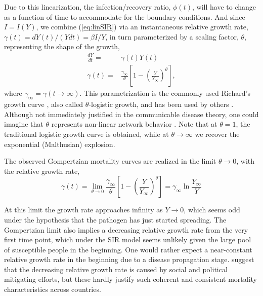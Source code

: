 \documentclass{article}
\begin{document}
 Due to this linearization, the infection/recovery ratio, $\phi(t)$, will have to change as a function of time to accommodate for the boundary conditions. And since $I=I(Y)$, we combine (\ref{eq:linSIR}) via an instantaneous relative growth rate, $\gamma(t) = dY(t) /(Ydt) = \beta I / Y$, in turn parameterized by a scaling factor, $\theta$, representing the shape of the growth,
\begin{subequations}
\label{eq:rypdal}
\begin{align}
\frac{dY}{dt} =& \gamma(t) Y(t) \label{eq:rypdalODE}\\
\gamma(t) =& \frac{\gamma_{\infty}}{\theta}\left[1 - \left(\frac{Y}{Y_{\infty}}\right)^{\theta} \right] \label{eq:rypdalGamma},
\end{align}
\end{subequations}
where $\gamma_{\infty} = \gamma(t\rightarrow \infty)$. This parametrization is the commonly used Richard's growth curve \citep{richards1959flexible}, also called $\theta$-logistic growth, and has been used by others \citep{wu2020generalized}. Although not immediately justified in the communicable disease theory, one could imagine that $\theta$ represents non-linear network behavior \citep{petroni2020logistic}. Note that at $\theta=1$, the traditional logistic growth curve is obtained, while at $\theta\rightarrow \infty$ we recover the exponential (Malthusian) explosion.

The observed Gompertzian mortality curves are realized in the limit $\theta \rightarrow 0$, with the relative growth rate, 
\begin{equation}
\label{eq:rypdalLimit}
\gamma(t) = \lim_{\theta \rightarrow 0}\frac{\gamma_{\infty}}{\theta}\left[1 - \left(\frac{Y}{Y_{\infty}}\right)^{\theta} \right]
= \gamma_{\infty}\ln{\frac{Y_{\infty}}{Y}}
\end{equation}

 At this limit the growth rate approaches infinity as $Y \rightarrow 0$, which seems odd under the hypothesis that the pathogen has just started spreading. 
 The Gompertzian limit also implies a decreasing relative growth rate from the very first time point, which under the SIR model seems unlikely given the large pool of susceptible people in the beginning. 
 One would rather expect a near-constant relative growth rate in the beginning due to a disease propagation stage. 
 \citet{Rypdal2020} suggest that the decreasing relative growth rate is caused by social and political mitigating efforts, but these hardly justify such coherent and consistent mortality characteristics across countries. 
 
\end{document}
